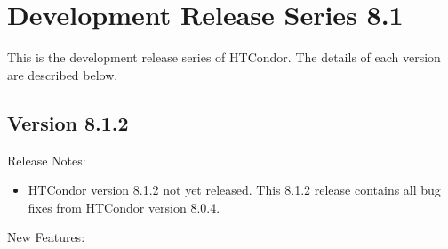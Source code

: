 
\section{\label{sec:History-8-1}Development Release Series 8.1}

This is the development release series of HTCondor.
The details of each version are described below.

\subsection*{\label{sec:New-8-1-2}Version 8.1.2}

\noindent Release Notes:

\begin{itemize}

\item HTCondor version 8.1.2 not yet released.
This 8.1.2 release contains all bug fixes from HTCondor version 8.0.4.

\end{itemize}


\noindent New Features:

